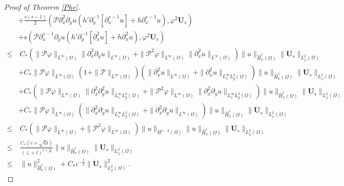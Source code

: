 \documentclass{amsart}
\numberwithin{equation}{section}
\begin{document}
\begin{proof}[Proof of Theorem \ref{Phe}]
\begin{align*}
 &+\frac{s(s-1)}{2}(\mathcal{P}\partial_{x}^{2}\partial_{y}u(h'\partial_{y}^{-1}[\partial_{x}^{s-1}u]+h\partial_{x}^{s-1}u),\varphi^{2}\mathbf{U}_{s})\\
 &+s(\mathcal{P}\partial_{x}^{s-1}\partial_{y}u(h'\partial_{y}^{-1}[\partial_{x}^{2}u]+h\partial_{x}^{2}u),\varphi^{2}\mathbf{U}_{s})\nonumber\\
\leq&~C_{*}(\|\mathcal{P}\varphi\|_{L^{\infty}(\Omega)}\|\partial_{x}^{2}\partial_{y}u\|_{L^{\infty}(\Omega)}
            +\|\mathcal{P}^{2}\varphi\|_{L^{\infty}(\Omega)}\|\partial_{x}^{2}u\|_{L^{\infty}(\Omega)})
           \|u\|_{\hat{H}_{\psi}^{s}(\Omega)}\|\mathbf{U}_{s}\|_{L_{\varphi}^{2}(\Omega)}\nonumber\\
    &+C_{*}\|\mathcal{P}\varphi\|_{L^{\infty}(\Omega)}(1+\|\mathcal{P}\|_{L^{\infty}(\Omega)})
           \left(\|\partial_{x}^{2}u\|_{L^{\infty}(\Omega)}+\|\partial_{x}^{2}u\|_{L_{x}^{\infty}L_{y}^{2}(\Omega)}\right)
           \|u\|_{\hat{H}_{\psi}^{s}(\Omega)}\|\mathbf{U}_{s}\|_{L_{\varphi}^{2}(\Omega)}\nonumber\\
    &+C_{*}(\|\mathcal{P}\varphi\|_{L^{\infty}(\Omega)}\|\partial_{x}^{2}\partial_{y}^{2}u\|_{L_{x}^{\infty}L_{y}^{2}(\Omega)}
            +\|\mathcal{P}^{2}\varphi\|_{L^{\infty}(\Omega)}\|\partial_{x}^{2}\partial_{y}u\|_{L_{x}^{\infty}L_{y}^{2}(\Omega)})
           \|u\|_{\hat{H}_{\psi}^{s}(\Omega)}\|\mathbf{U}_{s}\|_{L_{\varphi}^{2}(\Omega)}\nonumber\\
    &+C_{*}\|\mathcal{P}\varphi\|_{L^{\infty}(\Omega)}\left(\|\partial_{x}^{2}\partial_{y}u\|_{L_{x}^{\infty}L_{y}^{2}(\Omega)}
                                                     +\|\partial_{x}^{2}\partial_{y}u\|_{L^{\infty}(\Omega)}\right)
           \|u\|_{\hat{H}_{\psi}^{s}(\Omega)}\|\mathbf{U}_{s}\|_{L_{\varphi}^{2}(\Omega)}\nonumber\\
\leq&~C_{*}\left(\|\mathcal{P}\varphi\|_{L^{\infty}(\Omega)}+\|\mathcal{P}^{2}\varphi\|_{L^{\infty}(\Omega)}\right)
           \|u\|_{H^{s-3}(\Omega)}\|u\|_{\hat{H}_{\psi}^{s}(\Omega)}\|\mathbf{U}_{s}\|_{L_{\varphi}^{2}(\Omega)}\\
\leq&~\frac{C_{*}(\check{c}+\sqrt{\bar{\eta}}t)}{(\bar{\varsigma}+t)^{1+\frac{\varepsilon_{0}}{2}}}
      \|u\|_{\hat{H}_{\psi}^{s}(\Omega)}\|\mathbf{U}_{s}\|_{L_{\varphi}^{2}(\Omega)}\\
\leq&~\|u\|_{\hat{H}_{\psi}^{s}(\Omega)}^{2}
     +C_{*}\iota^{-\frac{5}{2}}\|\mathbf{U}_{s}\|_{L_{\varphi}^{2}(\Omega)}^{2}.
\end{align*}


\end{proof}
\end{document}
